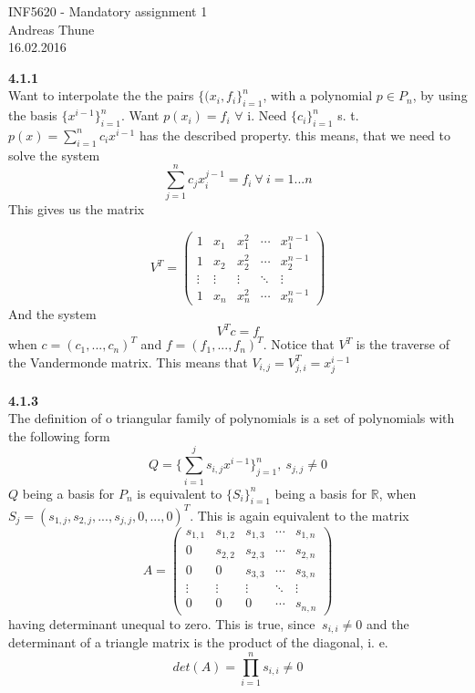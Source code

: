 \documentclass[11pt,a4paper]{report}
\begin{document}
\begin{center}

\LARGE INF5620 - Mandatory assignment 1
\\
Andreas Thune
\\
\LARGE
16.02.2016

\end{center}
\textbf{4.1.1}
\\
Want to interpolate the the pairs $\{(x_i,f_i \}_{i=1}^n$, with a polynomial $p \in P_n$, by using the basis $\{ x^{i-1}\}_{i=1}^n$. Want $p(x_i)=f_i$ $\forall$ i. Need $\{ c_i\}_{i=1}^n$ s. t. $p(x) = \sum_{i=1}^n c_ix^{i-1} $ has the described property. this means, that we need to solve the system $$\sum_{j=1}^n c_jx_i^{j-1} = f_i \ \forall \ i=1...n $$ This gives us the matrix

$$ 
V^T = 
 \begin{pmatrix}
  1 & x_1 & x_1^2 & \cdots & x_1^{n-1} \\
  1 & x_2 & x_2^2 &\cdots & x_2^{n-1} \\
  \vdots  & \vdots &\vdots  & \ddots & \vdots  \\
  1 & x_n & x_n^2 &\cdots & x_n^{n-1} 
 \end{pmatrix}
$$
And the system $$V^Tc=f$$ when $c=(c_1,...,c_n)^T$ and $f=(f_1,...,f_n)^T$. Notice that $V^T$ is the traverse of the Vandermonde matrix. This means that $V_{i,j} = V_{j,i}^T = x_j^{i-1}$
\\
\\
\textbf{4.1.3}
\\
The definition of o triangular family of polynomials is a set of polynomials with the following form $$Q=\{ \sum_{i=1}^js_{i,j}x^{i-1}\}_{j=1}^n, \ s_{j,j} \neq 0$$ $Q$ being a basis for $P_n$ is equivalent to $\{S_i\}_{i=1}^n$ being a basis for $\mathbb{R}$, when $S_j = (s_{1,j},s_{2,j},...,s_{j,j},0,...,0)^T$. This is again equivalent to the matrix $$ 
A = 
 \begin{pmatrix}
  s_{1,1} & s_{1,2} & s_{1,3} & \cdots & s_{1,n} \\
  0 & s_{2,2} & s_{2,3} &\cdots & s_{2,n} \\
  0 & 0 & s_{3,3} &\cdots & s_{3,n} \\
  \vdots  & \vdots &\vdots  & \ddots & \vdots  \\
  0 & 0 & 0 &\cdots & s_{n,n} 
 \end{pmatrix}
$$ having determinant unequal to zero. This is true, since $\ s_{i,i}\neq 0$ and the determinant of a triangle matrix is the product of the diagonal, i. e. $$det(A)=\prod_{i=1}^n s_{i,i}\neq 0$$ 
\end{document}
